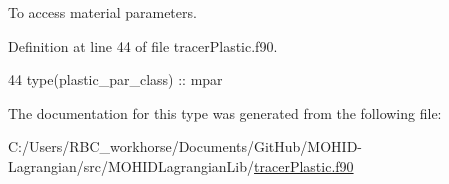 To access material parameters. 



Definition at line 44 of file tracer\+Plastic.\+f90.


\begin{DoxyCode}
44         \textcolor{keywordtype}{type}(plastic\_par\_class)   :: mpar
\end{DoxyCode}


The documentation for this type was generated from the following file\+:\begin{DoxyCompactItemize}
\item 
C\+:/\+Users/\+R\+B\+C\+\_\+workhorse/\+Documents/\+Git\+Hub/\+M\+O\+H\+I\+D-\/\+Lagrangian/src/\+M\+O\+H\+I\+D\+Lagrangian\+Lib/\mbox{\hyperlink{tracer_plastic_8f90}{tracer\+Plastic.\+f90}}\end{DoxyCompactItemize}
